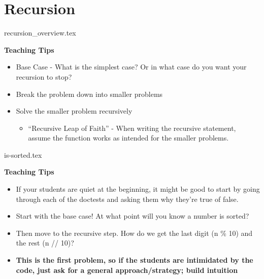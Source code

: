 \documentclass{exam}
\begin{document}
\section{Recursion}
{recursion_overview.tex}
\begin{guide}
	\textbf{Teaching Tips}
	\begin{itemize}
	    \item Base Case - What is the simplest case? Or in what case do you want your recursion to stop?
	    \item Break the problem down into smaller problems
		\item Solve the smaller problem recursively
		\begin{itemize}
			\item “Recursive Leap of Faith” - When writing the recursive statement, assume the function works as intended for the smaller problems.
		\end{itemize}
	\end{itemize}
\end{guide}
\begin{questions}
{is-sorted.tex}
\end{questions}
\begin{guide}
	\textbf{Teaching Tips}
	\begin{itemize}
	    \item If your students are quiet at the beginning, it might be good to start by going through each of the doctests and asking them why they're true of false.
	    \item Start with the base case! At what point will you know a number is sorted?
	    \item Then move to the recursive step. How do we get the last digit (n \% 10) and the rest (n // 10)?
	    \item \textbf{This is the first problem, so if the students are intimidated by the code, just ask for a general approach/strategy; build intuition}
	\end{itemize}
\end{guide}
\end{document}
